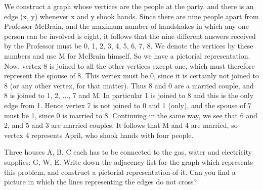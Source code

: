 \documentclass[a4paper, 12pt]{exam}
\begin{document}
\begin{questions}
\begin{solution}
\begin{center}
\begin{adjustbox}{max width=0.6\textwidth}
		\end{adjustbox}
		\end{center}

	
  	We construct a graph whose vertices are the people at the party, and there is an edge (x, y) whenever x and y shook hands.
  	Since there are nine people apart from Professor McBrain, and the maximum number of handshakes in which any one person can be involved is eight, it follows that the nine different answers received by the Professor must be 0, 1, 2, 3, 4, 5, 6, 7, 8.
  	We denote the vertices by these numbers and use M for McBrain himself.
  	So we have a pictorial representation.
  	Now, vertex 8 is joined to all the other vertices except one, which must therefore represent the spouse of 8.
  	This vertex must be 0, since it is certainly not joined to 8 (or any other vertex, for that matter).
  	Thus 8 and 0 are a married couple, and 8 is joined to 1, 2, ..., 7 and M.
  	In particular 1 is joined to 8 and this is the only edge from 1.
  	Hence vertex 7 is not joined to 0 and 1 (only), and the spouse of 7 must be 1, since 0 is married to 8.
  	Continuing in the same way, we see that 6 and 2, and 5 and 3 are married couples.
  	It follows that M and 4 are married, so vertex 4 represents April, who shook hands with four people.
  \end{solution}

\question
  Three houses A, B, C each has to be connected to the gas, water and electricity supplies: G, W, E.
  Write down the adjacency list for the graph which represents this problem, and construct a pictorial representation of it.
  Can you find a picture in which the lines representing the edges do not cross?~\cite{biggs02}
	\begin{solution}
		

\end{solution}
\end{questions}
\end{document}
